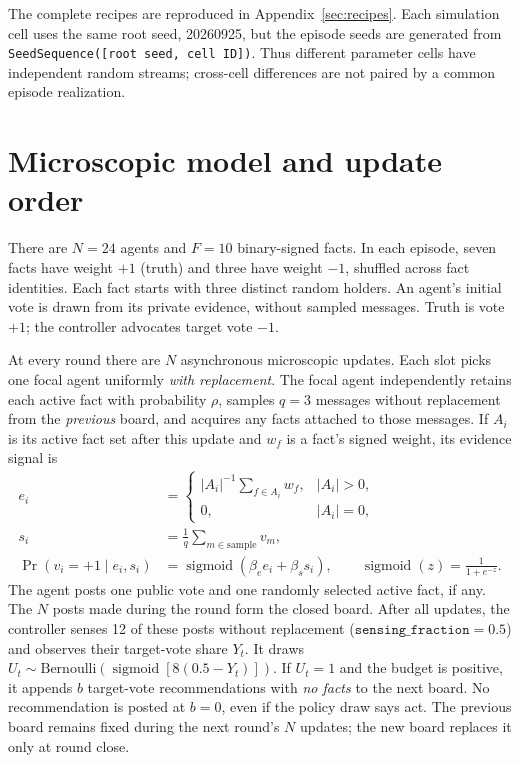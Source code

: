 \documentclass[10pt,a4paper]{article}
\newcommand{\sigm}{\operatorname{sigmoid}}
\begin{document}
The complete recipes are reproduced in Appendix~\ref{sec:recipes}. Each
simulation cell uses the same root seed, 20260925, but the episode seeds are
generated from \texttt{SeedSequence([root seed, cell ID])}. Thus different
parameter cells have independent random streams; cross-cell differences are
not paired by a common episode realization.

\section{Microscopic model and update order}
There are $N=24$ agents and $F=10$ binary-signed facts. In each episode, seven
facts have weight $+1$ (truth) and three have weight $-1$, shuffled across fact
identities. Each fact starts with three distinct random holders. An agent's
initial vote is drawn from its private evidence, without sampled messages.
Truth is vote $+1$; the controller advocates target vote $-1$.

At every round there are $N$ asynchronous microscopic updates. Each slot picks
one focal agent uniformly \emph{with replacement}. The focal agent independently
retains each active fact with probability $\rho$, samples $q=3$ messages without
replacement from the \emph{previous} board, and acquires any facts attached to
those messages. If $A_i$ is its active fact set after this update and $w_f$ is a
fact's signed weight, its evidence signal is
\begin{align*}
e_i&=\begin{cases}|A_i|^{-1}\sum_{f\in A_i}w_f,&|A_i|>0,\\0,&|A_i|=0,\end{cases}\\
s_i&=\frac{1}{q}\sum_{m\in\text{sample}}v_m,\\
\Pr(v_i=+1\mid e_i,s_i)&=\sigm(\beta_e e_i+\beta_s s_i),
\qquad \sigm(z)=\frac{1}{1+e^{-z}}.
\end{align*}
The agent posts one public vote and one randomly selected active fact, if any.
The $N$ posts made during the round form the closed board. After all updates,
the controller senses 12 of these posts without replacement
($\texttt{sensing\_fraction}=0.5$) and observes their target-vote share $Y_t$.
It draws $U_t\sim\mathrm{Bernoulli}(\sigm[8(0.5-Y_t)])$. If $U_t=1$ and the
budget is positive, it appends $b$ target-vote recommendations with \emph{no
facts} to the next board. No recommendation is posted at $b=0$, even if the
policy draw says act. The previous board remains fixed during the next round's
$N$ updates; the new board replaces it only at round close.
\end{document}
